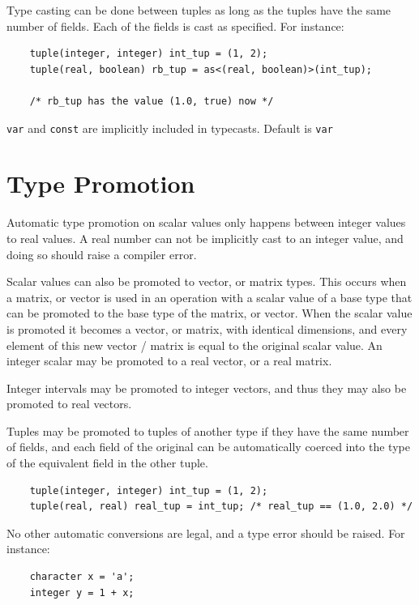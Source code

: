\documentclass{article}
\begin{document}
  Type casting can be done between tuples as long as the tuples have the same number of fields. Each of the fields is
  cast as specified. For instance:

  \begin{lstlisting}
    tuple(integer, integer) int_tup = (1, 2);
    tuple(real, boolean) rb_tup = as<(real, boolean)>(int_tup);

    /* rb_tup has the value (1.0, true) now */
  \end{lstlisting}

  \texttt{var} and \texttt{const} are implicitly included in typecasts. Default is \texttt{var}


\section{Type Promotion}\label{sec:typePromotion}

  Automatic type promotion on scalar values only happens between integer values to real values. A real number can not
  be implicitly cast to an integer value, and doing so should raise a compiler error.

  Scalar values can also be promoted to vector, or matrix types. This occurs when a matrix, or vector is used in an
  operation with a scalar value of a base type that can be promoted to the base type of the matrix, or vector. When
  the scalar value is promoted it becomes a vector, or matrix, with identical dimensions, and every element of this
  new vector / matrix is equal to the original scalar value. An integer scalar may be promoted to a real vector, or a
  real matrix.

  Integer intervals may be promoted to integer vectors, and thus they may also be promoted to real vectors.

  Tuples may be promoted to tuples of another type if they have the same number of fields, and each field of the
  original can be automatically coerced into the type of the equivalent field in the other tuple.

  \begin{lstlisting}
    tuple(integer, integer) int_tup = (1, 2);
    tuple(real, real) real_tup = int_tup; /* real_tup == (1.0, 2.0) */
  \end{lstlisting}

  No other automatic conversions are legal, and a type error should be raised.  For instance:

  \begin{lstlisting}
    character x = 'a';
    integer y = 1 + x;
  \end{lstlisting}
\end{document}
